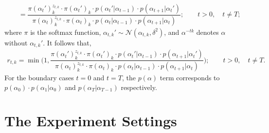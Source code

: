 \documentclass[12pt]{article}
\begin{document}
\begin{enumerate}
\begin{align*}
      &= \dfrac{\pi(\alpha_{t}')_k^{z_{t,k}}\cdot \pi(\alpha_{t}')_k\cdot p(\alpha_t'|\alpha_{t-1})\cdot p(\alpha_{t+1}|\alpha_t')}{\pi(\alpha_t)_k^{z_{t,k}}\cdot \pi(\alpha_{t})_k\cdot p(\alpha_t|\alpha_{t-1})\cdot p(\alpha_{t+1}|\alpha_t)}; \qquad t > 0, \quad t \neq T;
    \end{align*}
    where $\pi$ is the softmax function, $\alpha_{t,k}' \sim \mathcal{N}(\alpha_{t, k}, \delta^2)$, and $\alpha^{-tk}$ denotes $\alpha$ without $\alpha_{t,k}'$. It follows that,
    \begin{align*}
      r_{t,k} = \min{\bigg(1, \dfrac{\pi(\alpha_{t}')_k^{z_{t,k}}\cdot \pi(\alpha_{t}')_k\cdot p(\alpha_t'|\alpha_{t-1})\cdot p(\alpha_{t+1}|\alpha_t')}{\pi(\alpha_t)_k^{z_{t,k}}\cdot \pi(\alpha_{t})_k\cdot p(\alpha_t|\alpha_{t-1})\cdot p(\alpha_{t+1}|\alpha_t)}\bigg)}; \qquad t > 0, \quad t \neq T.
    \end{align*}
    For the boundary cases $t=0$ and $t=T$, the $p(\alpha)$ term corresponds to $p(\alpha_{0})\cdot p(\alpha_{1}|\alpha_{0})$ and $p(\alpha_{T}|\alpha_{T-1})$ respectively.


\end{enumerate}



\section*{The Experiment Settings}
\end{document}
